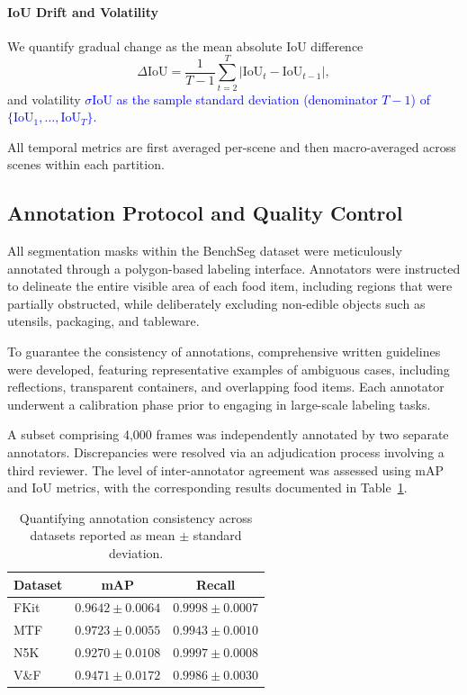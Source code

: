 \documentclass[preprint,12pt]{elsarticle}
\newcommand{\change}[1]{\textcolor{blue}{#1}}
\begin{document}
\paragraph{IoU Drift and Volatility}
We quantify gradual change as the mean absolute IoU difference
\begin{equation}
\Delta \mathrm{IoU} = \frac{1}{T-1}\sum_{t=2}^{T} |\mathrm{IoU}_{t} - \mathrm{IoU}_{t-1}|,
\end{equation}
and volatility \change{$\sigma\mathrm{IoU}$ as the sample standard deviation (denominator $T-1$) of $\{\mathrm{IoU}_1,\dots,\mathrm{IoU}_T\}$.}

All temporal metrics are first averaged per-scene and then macro-averaged across scenes within each partition.

\subsection{Annotation Protocol and Quality Control}
All segmentation masks within the BenchSeg dataset were meticulously annotated through a polygon-based labeling interface. Annotators were instructed to delineate the entire visible area of each food item, including regions that were partially obstructed, while deliberately excluding non-edible objects such as utensils, packaging, and tableware.

To guarantee the consistency of annotations, comprehensive written guidelines were developed, featuring representative examples of ambiguous cases, including reflections, transparent containers, and overlapping food items. Each annotator underwent a calibration phase prior to engaging in large-scale labeling tasks.

A subset comprising 4,000 frames was independently annotated by two separate annotators. Discrepancies were resolved via an adjudication process involving a third reviewer. The level of inter-annotator agreement was assessed using mAP and IoU metrics, with the corresponding results documented in Table~\ref{tab:quantify_annotation_consistency}.
\begin{table}[htb]
\centering
\caption{Quantifying annotation consistency across datasets reported as mean $\pm$ standard deviation.}
\begin{tabular}{lcc}
\toprule
Dataset & mAP & Recall \\
\midrule
FKit & $0.9642 \pm 0.0064$ & $0.9998 \pm 0.0007$ \\
\rowcolor{gray!12}MTF     & $0.9723 \pm 0.0055$ & $0.9943 \pm 0.0010$ \\
N5K     & $0.9270 \pm 0.0108$ & $0.9997 \pm 0.0008$ \\
\rowcolor{gray!12}V\&F    & $0.9471 \pm 0.0172$ & $0.9986 \pm 0.0030$ \\
\bottomrule
\end{tabular}
\label{tab:quantify_annotation_consistency}
\end{table}
\end{document}

